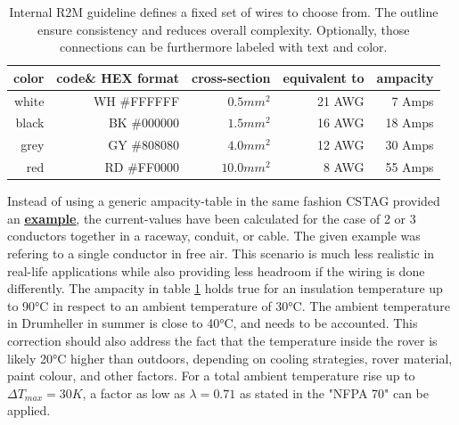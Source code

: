     \begin{table}[h] %
        \centering
        \begin{tabular}{|r|r|r|r|r|} \hline 
          color\footnotemark[1]&  code\footnotemark[2] \& HEX format&  cross-section\footnotemark[3]&  equivalent to&  ampacity\footnotemark[4] \\ \hline 
                          white&          WH \#FFFFFF&                    $0.5mm^2$&                          21 AWG&                 7 Amps    \\ \hline 
                          black&          BK \#000000&                    $1.5mm^2$&                          16 AWG&                18 Amps    \\ \hline 
                           grey&          GY \#808080&                    $4.0mm^2$&                          12 AWG&                30 Amps    \\ \hline 
                            red&          RD \#FF0000&                   $10.0mm^2$&                           8 AWG&                55 Amps    \\ \hline
        \end{tabular}
        \caption{Internal R2M guideline defines a fixed set of wires to choose from. The outline ensure consistency and reduces overall complexity. Optionally, those connections can be furthermore labeled with text and color.}
        \label{color_codes}
    \end{table}

    Instead of using a generic ampacity-table in the same fashion CSTAG provided an \href{https://web.archive.org/web/20230310184047/https://www.coonerwire.com/amp-chart/}{\textbf{\underline{example}}}, the current-values have been calculated for the case of 2 or 3 conductors together in a raceway, conduit, or cable. The given example was refering to a single conductor in free air. This scenario is much less realistic in real-life applications while also providing less headroom if the wiring is done differently. The ampacity in table \ref{color_codes} holds true for an insulation temperature up to 90°C in respect to an ambient temperature of 30°C. The ambient temperature in Drumheller in summer is close to 40°C, and needs to be accounted. This correction should also address the fact that the temperature inside the rover is likely 20°C higher than outdoors, depending on cooling strategies, rover material, paint colour, and other factors. For a total ambient temperature rise up to $\Delta T_{max} = 30K$, a factor as low as $\lambda = 0.71$ as stated in the "NFPA 70" can be applied.

